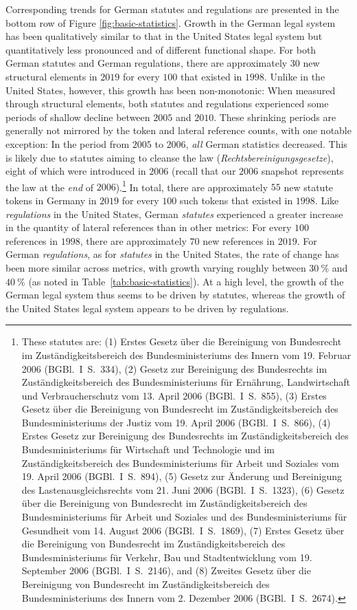 \documentclass[utf8,sort&compress,table,hidelinks]{frontiersFPHY} %
\begin{document}
Corresponding trends for German statutes and regulations are presented in the bottom row of Figure \ref{fig:basic-statistics}.  
Growth in the German legal system has been qualitatively similar to that in the United States legal system but quantitatively less pronounced and of different functional shape. 
For both German statutes and German regulations, there are approximately $30$ new structural elements in $2019$ for every $100$ that existed in $1998$. 
Unlike in the United States, however, this growth has been non-monotonic: 
When measured through structural elements, both statutes and regulations experienced some periods of shallow decline between $2005$ and $2010$.
These shrinking periods are generally not mirrored by the token and lateral reference counts, with one notable exception:
In the period from $2005$ to $2006$, \emph{all} German statistics decreased. 
This is likely due to statutes aiming to cleanse the law (\emph{Rechtsbereinigungsgesetze}), eight of which were introduced in $2006$ (recall that our $2006$ snapshot represents the law at the \emph{end} of $2006$).\footnote{%
These statutes are: 
(1) Erstes Gesetz über die Bereinigung von Bundesrecht im Zuständigkeitsbereich des Bundesministeriums des Innern vom 19. Februar 2006 (BGBl.~I~S.~334),
(2) Gesetz zur Bereinigung des Bundesrechts im Zuständigkeitsbereich des Bundesministeriums für Ernährung, Landwirtschaft und Verbraucherschutz vom 13. April 2006 (BGBl.~I~S.~855),
(3) Erstes Gesetz über die Bereinigung von Bundesrecht im Zuständigkeitsbereich des Bundesministeriums der Justiz vom 19. April 2006 (BGBl.~I~S.~866),
(4) Erstes Gesetz zur Bereinigung des Bundesrechts im Zuständigkeitsbereich des Bundesministeriums für Wirtschaft und Technologie und im Zuständigkeitsbereich des Bundesministeriums für Arbeit und Soziales vom 19. April 2006 (BGBl.~I~S.~894),
(5) Gesetz zur Änderung und Bereinigung des Lastenausgleichsrechts vom 21. Juni 2006 (BGBl.~I~S.~1323),
(6) Gesetz über die Bereinigung von Bundesrecht im Zuständigkeitsbereich des Bundesministeriums für Arbeit und Soziales und des Bundesministeriums für Gesundheit vom 14. August 2006 (BGBl.~I~S.~1869),
(7) Erstes Gesetz über die Bereinigung von Bundesrecht im Zuständigkeitsbereich des Bundesministeriums für Verkehr, Bau und Stadtentwicklung vom 19. September 2006 (BGBl.~I~S.~2146), and
(8) Zweites Gesetz über die Bereinigung von Bundesrecht im Zuständigkeitsbereich des Bundesministeriums des Innern vom 2. Dezember 2006 (BGBl.~I~S.~2674).
}
In total, there are approximately $55$ new statute tokens in Germany in $2019$ for every $100$ such tokens that existed in $1998$. 
Like \emph{regulations} in the United States, German \emph{statutes} experienced a greater increase in the quantity of lateral references than in other metrics: 
For every $100$ references in $1998$, there are approximately $70$ new references in $2019$. 
For German \emph{regulations}, as for \emph{statutes} in the United States, the rate of change has been more similar across metrics, with growth varying roughly between $30~\%$ and $40~\%$ (as noted in Table~\ref{tab:basic-statistics}).
At a high level, the growth of the German legal system thus seems to be driven by statutes, whereas the growth of the United States legal system appears to be driven by regulations.
\end{document}
